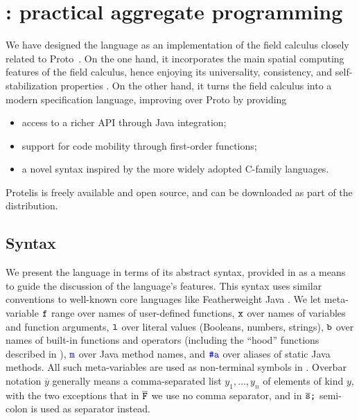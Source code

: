 \documentclass[12pt,a4paper,twoside,openright]{book}
\begin{document}

\chapter{\protelis{}: practical aggregate programming}
\label{protelis-language}
We have designed the \protelis{} language as an implementation of the field calculus \cite{VDB-FOCLASA-CIC2013} closely related to Proto~\cite{proto}.
%
On the one hand, it incorporates the main spatial computing features of the field calculus, hence enjoying its universality, consistency, and self-stabilization properties \cite{BVD-SCW14,VD-COORD2014-LNCS2014}.
%
On the other hand, it turns the field calculus into a modern specification language, improving over Proto by providing
\begin{itemize}
 \item access to a richer API through Java integration;
 \item support for code mobility through first-order functions;
 \item a novel syntax inspired by the more widely adopted C-family languages.
\end{itemize}

Protelis is freely available and open source, and can be downloaded as part of the \alchemist{} distribution.

\section{Syntax}

We present the \protelis{} language in terms of its abstract syntax, provided in  as a means to guide the discussion of the language's features.
%
This syntax uses similar conventions to well-known core languages like Featherweight Java \cite{FJ}.
%
We let meta-variable $\texttt{f}$ range over names of user-defined functions, $\texttt{x}$ over names of variables and function arguments, $\texttt{l}$ over literal values (Booleans, numbers, strings), $\texttt{b}$ over names of built-in functions and operators (including the ``hood'' functions described in ), $\textcolor{blue}{\texttt{m}}$ over Java method names, and $\textcolor{blue}{\texttt{\#a}}$ over aliases of static Java methods.
%
All such meta-variables are used as non-terminal symbols in .
%
Overbar notation $\overline{y}$ generally means a comma-separated list $y_1,\ldots,y_n$ of elements of kind $y$, with the two exceptions that in $\overline{\texttt{F}}$ we use no comma separator, and in $\overline{\texttt{s}}\texttt{;}$ semi-colon is used as separator instead.
\end{document}
